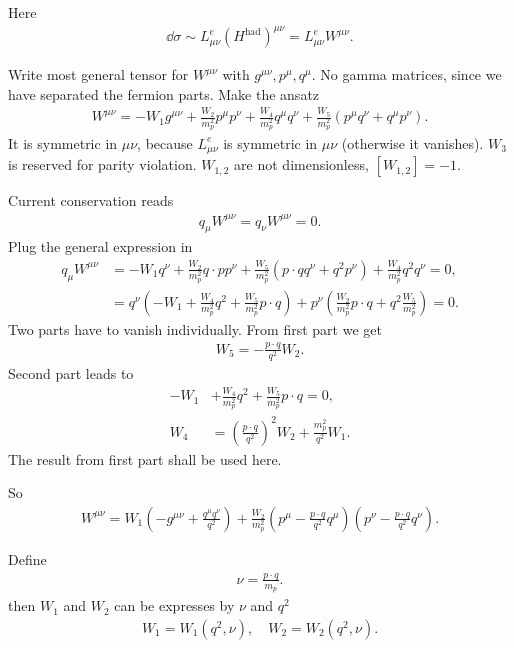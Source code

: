 Here
\begin{align*}
   \dd{\sigma} \sim L^e_{\mu\nu} (H^{\text{had}})^{\mu\nu} = L^e_{\mu\nu} W^{\mu\nu}.
\end{align*}

Write most general tensor for $W^{\mu\nu}$ with $g^{\mu\nu}, p^\mu, q^\mu$. No gamma matrices, since we have separated the fermion parts. Make the ansatz
\begin{align}
   W^{\mu\nu} = - W_1 g^{\mu\nu} + \frac{W_2}{m_p^2} p^\mu p^\nu + \frac{W_4}{m_p^2} q^\mu q^\nu + \frac{W_5}{m_p^2} (p^\mu q^\nu + q^\mu p^\nu).
\end{align}
It is symmetric in $\mu\nu$, because $L^e_{\mu\nu}$ is symmetric in $\mu\nu$ (otherwise it vanishes). $W_3$ is reserved for parity violation. $W_{1,2}$ are not dimensionless, $[W_{1,2}] = -1$.

Current conservation reads
\begin{align*}
   q_\mu W^{\mu\nu} = q_\nu W^{\mu\nu} = 0.
\end{align*}
Plug the general expression in
\begin{align*}
   q_\mu W^{\mu\nu} &= - W_1 q^\nu + \frac{W_2}{m_p^2} q\cdot p p^\nu + \frac{W_5}{m_p^2} \left( p \cdot q q^\nu + q^2 p^\nu \right) + \frac{W_4}{m_p^2} q^2 q^\nu = 0, \\
                    &= q^\nu \left( - W_1 + \frac{W_4}{m_p^2} q^2 + \frac{W_5}{m_p^2} p \cdot q \right) + p^\nu \left( \frac{W_2}{m_p^2} p \cdot q + q^2 \frac{W_5}{m_p^2} \right) = 0.
\end{align*}
Two parts have to vanish individually. From first part we get
\begin{align*}
   W_5 = - \frac{p \cdot q}{q^2} W_2.
\end{align*}
Second part leads to
\begin{align*}
   -W_1 &+ \frac{W_4}{m_p^2} q^2 + \frac{W_5}{m_p^2} p \cdot q = 0, \\
   W_4 &= \left( \frac{p \cdot q}{q^2} \right)^2 W_2 + \frac{m_p^2 }{q^2} W_1.
\end{align*}
The result from first part shall be used here.

So
\begin{align*}
   W^{\mu\nu} = W_1 \left( -g^{\mu\nu} + \frac{q^\mu q^\nu}{q^2} \right) + \frac{W_2}{m_p^2} \left( p^\mu - \frac{p\cdot q}{q^2} q^\mu \right) \left( p^\nu - \frac{p\cdot q}{q^2} q^\nu \right).
\end{align*}

Define
\begin{align}
   \nu = \frac{p \cdot q}{m_p}.
\end{align}
then $W_1$ and $W_2$ can be expresses by $\nu$ and $q^2$
\begin{align*}
   W_1 = W_1 (q^2, \nu), \quad W_2 = W_2 (q^2 , \nu).
\end{align*}

